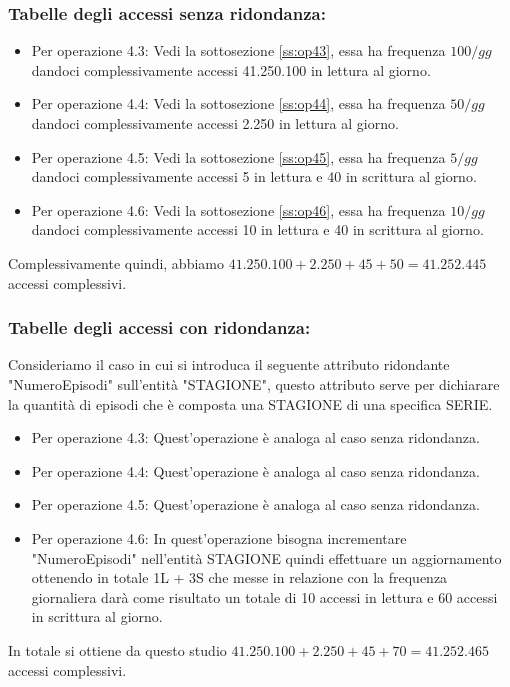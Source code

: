 \documentclass[a4paper,12pt]{report}
\begin{document}
\subsubsection{Tabelle degli accessi senza ridondanza:}
\begin{itemize}
	\item Per operazione 4.3: Vedi la sottosezione \ref{ss:op43}, essa ha frequenza $100/gg$ dandoci complessivamente accessi 41.250.100 in lettura al giorno.
	\item Per operazione 4.4: Vedi la sottosezione \ref{ss:op44}, essa ha frequenza $50/gg$ dandoci complessivamente accessi 2.250 in lettura al giorno.
	\item Per operazione 4.5: Vedi la sottosezione \ref{ss:op45}, essa ha frequenza $5/gg$ dandoci complessivamente accessi 5 in lettura e 40 in scrittura al giorno.
	\item Per operazione 4.6: Vedi la sottosezione \ref{ss:op46}, essa ha frequenza $10/gg$ dandoci complessivamente accessi 10 in lettura e 40 in scrittura al giorno.
\end{itemize}
Complessivamente quindi, abbiamo $41.250.100 + 2.250 + 45 + 50 = 41.252.445$ accessi complessivi.
\subsubsection{Tabelle degli accessi con ridondanza:}
Consideriamo il caso in cui si introduca il seguente attributo ridondante "NumeroEpisodi" sull'entità "STAGIONE", questo attributo serve per dichiarare la quantità di episodi che è composta una STAGIONE di una specifica SERIE.
\begin{itemize}
	\item Per operazione 4.3: Quest'operazione è analoga al caso senza ridondanza.
	\item Per operazione 4.4: Quest'operazione è analoga al caso senza ridondanza.
	\item Per operazione 4.5: Quest'operazione è analoga al caso senza ridondanza.
	\item Per operazione 4.6: In quest'operazione bisogna incrementare "NumeroEpisodi" nell'entità STAGIONE quindi effettuare un aggiornamento ottenendo in totale 1L + 3S che messe in relazione con la frequenza giornaliera darà come risultato un totale di 10 accessi in lettura e 60 accessi in scrittura al giorno.
\end{itemize}

In totale si ottiene da questo studio $41.250.100 + 2.250 + 45 + 70 = 41.252.465$ accessi complessivi.
\end{document}
